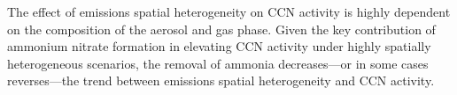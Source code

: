 \documentclass[journal abbreviation, manuscript]{copernicus}
\begin{document}
The effect of emissions spatial heterogeneity on CCN activity is highly dependent on the composition of the aerosol and gas phase. Given the key contribution of ammonium nitrate formation in elevating CCN activity under highly spatially heterogeneous scenarios, the removal of ammonia decreases---or in some cases reverses---the trend between emissions spatial heterogeneity and CCN activity.  













\appendix
\section{}    %

\subsection{}     %


\noappendix       %


\end{document}
